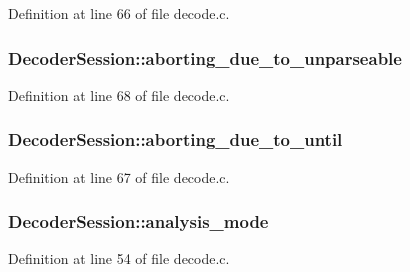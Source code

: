 Definition at line 66 of file decode.\+c.

\subsubsection[{\texorpdfstring{aborting\+\_\+due\+\_\+to\+\_\+unparseable}{aborting_due_to_unparseable}}]{ Decoder\+Session\+::aborting\+\_\+due\+\_\+to\+\_\+unparseable}\hypertarget{struct_decoder_session_ae0455203170ffffc3d698183f0fac3d6}{}\label{struct_decoder_session_ae0455203170ffffc3d698183f0fac3d6}


Definition at line 68 of file decode.\+c.

\subsubsection[{\texorpdfstring{aborting\+\_\+due\+\_\+to\+\_\+until}{aborting_due_to_until}}]{ Decoder\+Session\+::aborting\+\_\+due\+\_\+to\+\_\+until}\hypertarget{struct_decoder_session_a49d6dfa8af2fdea84d807c388082df7a}{}\label{struct_decoder_session_a49d6dfa8af2fdea84d807c388082df7a}


Definition at line 67 of file decode.\+c.

\subsubsection[{\texorpdfstring{analysis\+\_\+mode}{analysis_mode}}]{ Decoder\+Session\+::analysis\+\_\+mode}\hypertarget{struct_decoder_session_a4052e10ebd4e30942f850ff3a8a6ad7a}{}\label{struct_decoder_session_a4052e10ebd4e30942f850ff3a8a6ad7a}


Definition at line 54 of file decode.\+c.

